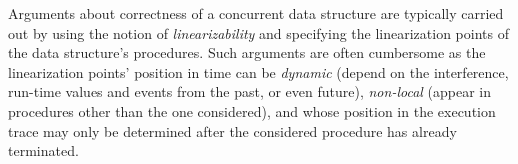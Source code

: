 



Arguments about correctness of a concurrent data structure are
typically carried out by using the notion of \emph{linearizability}
and specifying the linearization points of the data structure's
procedures.
%
Such arguments are often cumbersome as the linearization points'
position in time can be \emph{dynamic} (depend on the interference,
run-time values and events from the past, or even future),
\emph{non-local} (appear in procedures other than the one considered),
and whose position in the execution trace may only be determined after
the considered procedure has already terminated.


